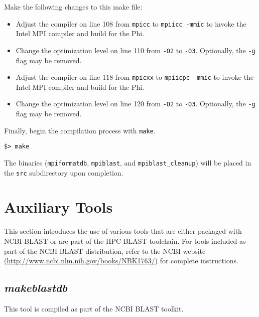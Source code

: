 \documentclass[10pt]{article}
\begin{document}
\noindent Make the following changes to this make file:
\begin{itemize}
\item Adjust the compiler on line 108 from \verb^mpicc^ to \verb^mpiicc -mmic^ to invoke the Intel MPI compiler and build for the Phi.
\item Change the optimization level on line 110 from \verb^-O2^ to \verb^-O3^.  Optionally, the \verb^-g^ flag may be removed.
\item Adjust the compiler on line 118 from \verb^mpicxx^ to \verb^mpiicpc -mmic^ to invoke the Intel MPI compiler and build for the Phi.
\item Change the optimization level on line 120 from \verb^-O2^ to \verb^-O3^.  Optionally, the \verb^-g^ flag may be removed.
\end{itemize}
\noindent Finally, begin the compilation process with \verb^make^.
\begin{verbatim}
$> make
\end{verbatim}
\noindent The binaries (\verb^mpiformatdb^, \verb^mpiblast^, and \verb^mpiblast_cleanup^) will be placed in the \verb^src^ subdirectory upon completion.

\clearpage

\section{Auxiliary Tools} \label{sec:auxtools}

This section introduces the use of various tools that are either packaged with NCBI BLAST or are part of the HPC-BLAST toolchain.  For tools included as part of the NCBI BLAST distribution, refer
to the NCBI website (\url{http://www.ncbi.nlm.nih.gov/books/NBK1763/}) for complete instructions.

\subsection{\emph{makeblastdb}} \label{ssec:makeblastdb}

 This tool is compiled as part of the NCBI BLAST toolkit.\\
\end{document}
